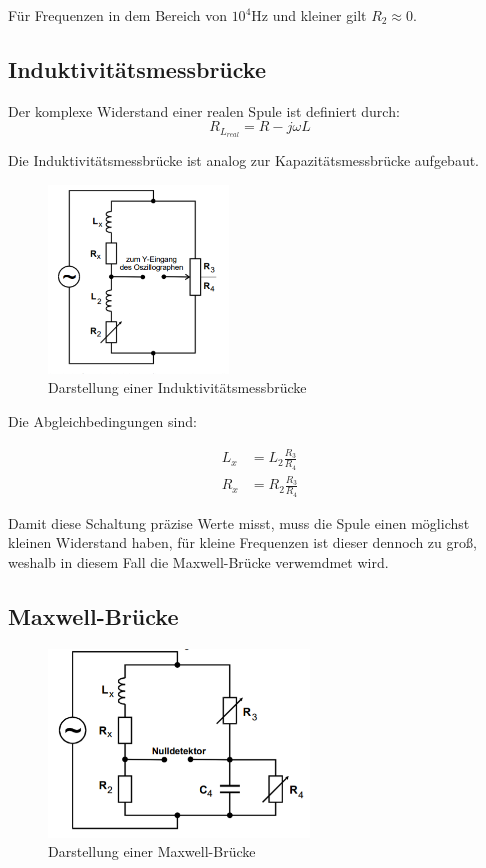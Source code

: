 Für Frequenzen in dem Bereich von $10^4$Hz und kleiner gilt $R_2 \approx 0$.


\subsection{Induktivitätsmessbrücke}
Der komplexe Widerstand einer realen Spule ist definiert durch:
\begin{equation}
  R_{L_{real}} = R - j \omega L
\end{equation}

Die Induktivitätsmessbrücke ist analog zur Kapazitätsmessbrücke aufgebaut.

\begin{figure}[H]
  \centering
  \includegraphics[height=5cm]{induktivitaet.PNG}
  \caption{Darstellung einer Induktivitätsmessbrücke}
  \label{fig:induktivitaet}
\end{figure}

Die Abgleichbedingungen sind:

\begin{align}
  L_x &= L_2 \frac{R_3}{R_4} \\
  R_x &= R_2 \frac{R_3}{R_4}
\end{align}

Damit diese Schaltung präzise Werte misst, muss die Spule einen möglichst kleinen Widerstand haben, für kleine Frequenzen
ist dieser dennoch zu groß, weshalb in diesem Fall die Maxwell-Brücke verwemdmet wird.

\subsection{Maxwell-Brücke}

\begin{figure}[H]
  \centering
  \includegraphics[height=5cm]{maxwell.PNG}
  \caption{Darstellung einer Maxwell-Brücke}
  \label{fig:maxwell}
\end{figure}

